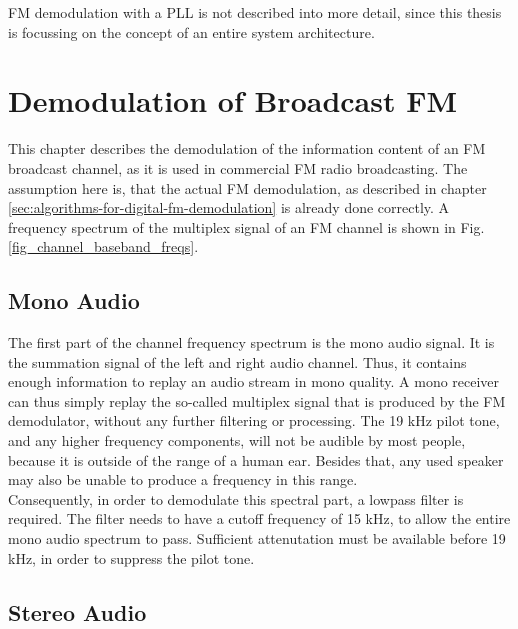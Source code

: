 FM demodulation with a PLL is not described into more detail, since this thesis is focussing on the concept of an entire system architecture.

\section{Demodulation of Broadcast FM}

This chapter describes the demodulation of the information content of an FM broadcast channel, as it is used in commercial FM radio broadcasting.
The assumption here is, that the actual FM demodulation, as described in chapter \ref{sec:algorithms-for-digital-fm-demodulation} is already done correctly.
A frequency spectrum of the multiplex signal of an FM channel is shown in Fig.\ref{fig_channel_baseband_freqs}.

\subsection{Mono Audio}
\label{subsec:demod_mono}

The first part of the channel frequency spectrum is the mono audio signal.
It is the summation signal of the left and right audio channel.
Thus, it contains enough information to replay an audio stream in mono quality.
A mono receiver can thus simply replay the so-called multiplex signal that is produced by the FM demodulator, without any further filtering or processing.
The 19 kHz pilot tone, and any higher frequency components, will not be audible by most people, because it is outside of the range of a human ear.
Besides that, any used speaker may also be unable to produce a frequency in this range.\\

Consequently, in order to demodulate this spectral part, a lowpass filter is required.
The filter needs to have a cutoff frequency of 15 kHz, to allow the entire mono audio spectrum to pass.
Sufficient attenutation must be available before 19 kHz, in order to suppress the pilot tone.

\subsection{Stereo Audio}

